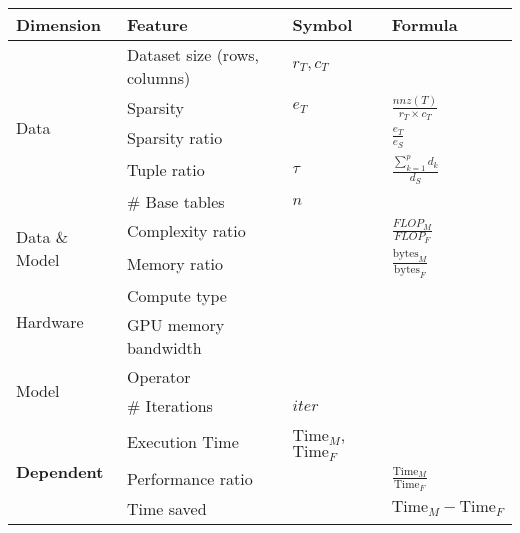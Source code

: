 \begin{tabular}{llll}
\toprule
Dimension & Feature & Symbol & Formula \\
\midrule\midrule
\multirow[t]{5}{*}{Data} & Dataset size (rows, columns) & $r_T, c_T$ &  \\

 & Sparsity & $e_T$ & $\frac{nnz(T)}{r_T\times c_T}$ \\

 & Sparsity ratio &  & $\frac{e_T}{e_S}$ \\

 & Tuple ratio & $\tau$ & $\frac{\sum_{k=1}^p d_k}{d_S}$ \\

 & \# Base tables & $n$ &  \\
 
\multirow[t]{2}{*}{Data \& Model} & Complexity ratio &  & $\frac{FLOP_M}{FLOP_F}$ \\

 & Memory ratio &  & $\frac{\text{bytes}_M}{\text{bytes}_F}$ \\
 
\multirow[t]{2}{*}{Hardware} & Compute type &  &  \\

 & GPU memory bandwidth &  &  \\
 
\multirow[t]{2}{*}{Model} & Operator &  &  \\

 & \# Iterations & $iter$ &  \\
 
\multirow[t]{3}{*}{\textbf{Dependent}} & Execution Time & $\text{Time}_M$, $\text{Time}_F$ &  \\

 & Performance ratio &  & $\frac{\text{Time}_M}{\text{Time}_F}$ \\

 & Time saved &  & $\text{Time}_M - \text{Time}_F$ \\
 
\bottomrule
\end{tabular}
